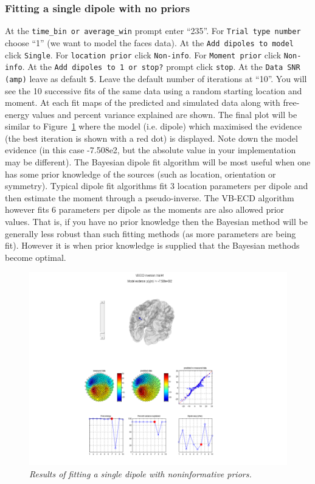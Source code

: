 \subsubsection{Fitting a single dipole with no priors}
At the \texttt{time\_bin or average\_win} prompt enter ``235''. For \texttt{Trial type number} choose ``1'' (we want to model the faces data). At the \texttt{Add dipoles to model} click \texttt{Single}. For \texttt{location prior} click \texttt{Non-info}. For \texttt{Moment prior} click \texttt{Non-info}. At the \texttt{Add dipoles to 1 or stop?} prompt click \texttt{stop}. At the \texttt{Data SNR (amp)} leave as default \texttt{5}. Leave the default number of iterations at ``10''.
You will see the 10 successive fits of the same data using a random starting location and moment. At each fit maps of the predicted and simulated data along with free-energy values and percent variance explained are shown. The final plot will be similar to Figure~\ref{meg_sloc:fig:10} where the model (i.e. dipole) which maximised the evidence (the best iteration is shown with a red dot) is displayed. Note down the model evidence (in this case -7.508e2, but the absolute value in your implementation may be different). The Bayesian dipole fit algorithm will be most useful when one has some prior knowledge of the sources (such as location, orientation or symmetry). Typical dipole fit algorithms fit 3 location parameters per dipole and then estimate the moment through a pseudo-inverse. The VB-ECD algorithm however fits 6 parameters per dipole as the moments are also allowed prior values. That is, if you have no prior knowledge then the Bayesian method will be generally less robust than such fitting methods (as more parameters are being fit). However it is when prior knowledge is supplied that the Bayesian methods become optimal.

\begin{figure}
\begin{center}
\includegraphics[width=140mm]{meg_sloc/slide10}
\caption{\em Results of fitting a single dipole with noninformative priors.\label{meg_sloc:fig:10}}
\end{center}
\end{figure}


